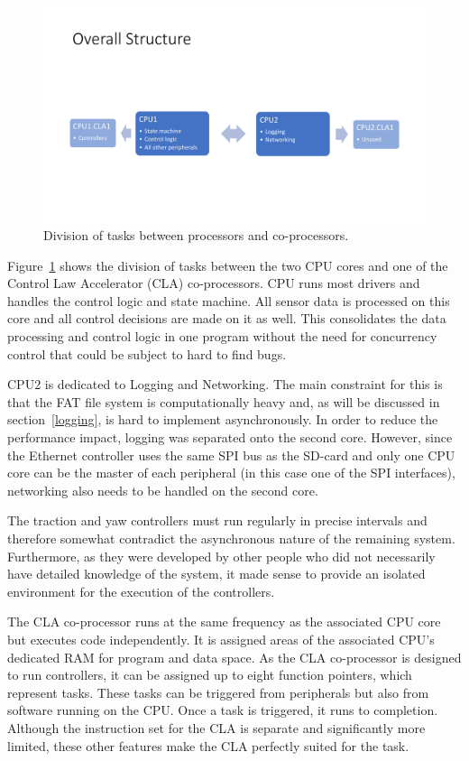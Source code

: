 \begin{figure}[H]
    \centering \includegraphics[width=1.0\textwidth]{./figures/system_structure.pdf}
    \caption{Division of tasks between processors and co-processors.}
    \label{fig:system_structure}
\end{figure}

Figure~\ref{fig:system_structure} shows the division of tasks between the two CPU cores and one of the Control Law Accelerator (CLA) co-processors. CPU runs most drivers and handles the control logic and state machine. All sensor data is processed on this core and all control decisions are made on it as well. This consolidates the data processing and control logic in one program without the need for concurrency control that could be subject to hard to find bugs.

CPU2 is dedicated to Logging and Networking. The main constraint for this is that the FAT file system is computationally heavy and, as will be discussed in section~\ref{logging}, is hard to implement asynchronously. In order to reduce the performance impact, logging was separated onto the second core. However, since the Ethernet controller uses the same SPI bus as the SD-card and only one CPU core can be the master of each peripheral (in this case one of the SPI interfaces), networking also needs to be handled on the second core.

The traction and yaw controllers must run regularly in precise intervals and therefore somewhat contradict the asynchronous nature of the remaining system. Furthermore, as they were developed by other people who did not necessarily have detailed knowledge of the system, it made sense to provide an isolated environment for the execution of the controllers.

The CLA co-processor runs at the same frequency as the associated CPU core but executes code independently. It is assigned areas of the associated CPU's dedicated RAM for program and data space. As the CLA co-processor is designed to run controllers, it can be assigned up to eight function pointers, which represent tasks. These tasks can be triggered from peripherals but also from software running on the CPU. Once a task is triggered, it runs to completion. Although the instruction set for the CLA is separate and significantly more limited, these other features make the CLA perfectly suited for the task.

